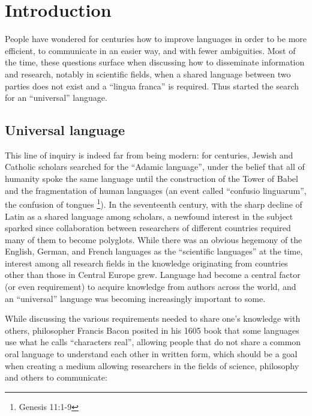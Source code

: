 \chapter{Introduction}

\vspace{0.5cm}

People have wondered for centuries how to improve languages in order to be more efficient, to communicate in an easier way, and with fewer ambiguities.
Most of the time, these questions surface when discussing how to disseminate information and research, notably in scientific fields, when a shared language
between two parties does not exist and a ``lingua franca'' is required. Thus started the search for an ``universal'' language.

\section{Universal language}

This line of inquiry is indeed far from being modern: for centuries, Jewish and Catholic scholars searched for the ``Adamic language'', under the belief that
all of humanity spoke the same language until the construction of the Tower of Babel and the fragmentation of human languages (an event called ``confusio linguarum'',
the confusion of tongues \footnote{Genesis 11:1-9}). In the seventeenth century, with the sharp decline of Latin as a shared language among scholars, a newfound interest in
the subject sparked since collaboration between researchers of different countries required many of them to become polyglots. While there was an obvious hegemony of the English,
German, and French languages as the ``scientific languages'' at the time, interest among all research fields in the knowledge originating from countries other than those in Central Europe grew.
Language had become a central factor (or even requirement) to acquire knowledge from authors across the world, and an ``universal'' language was becoming increasingly important to some.\newline

While discussing the various requirements needed to share one's knowledge with others, philosopher Francis Bacon posited in his 1605 book that some languages use what
he calls ``characters real'', allowing people that do not share a common oral language to understand each other in written form, which should be a goal when creating a
medium allowing researchers in the fields of science, philosophy and others to communicate:

